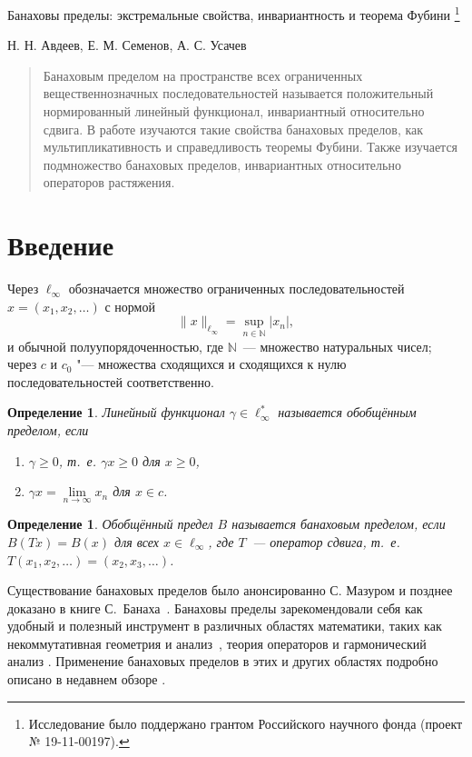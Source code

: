 \documentclass[12pt]{article}
\newtheorem{dfn}[thm]{Определение}
\begin{document}
\begin{center}
{
	\Large Банаховы пределы: экстремальные свойства, инвариантность и теорема Фубини
	\footnote{
		Исследование было поддержано грантом Российского научного фонда (проект № 19-11-00197).

	}
}

Н. Н. Авдеев, Е. М. Семенов, А. С. Усачев
\end{center}

\begin{abstract}
Банаховым пределом на пространстве всех ограниченных вещественнозначных последовательностей называется положительный нормированный линейный функционал, инвариантный относительно сдвига. В работе изучаются такие свойства банаховых пределов, как мультипликативность и справедливость теоремы Фубини. Также изучается подмножество банаховых пределов, инвариантных относительно операторов растяжения.
\end{abstract}


\section{Введение}


Через $\ell_\infty$ обозначается множество ограниченных
последовательностей $x=(x_1,x_2,\ldots)$ с нормой
\[
 \|x\|_{\ell_\infty}=\sup_{n\in \mathbb N}|x_n|,
\]
и обычной полуупорядоченностью, где ${\mathbb N}$~--- множество натуральных чисел;
через $c$ и $c_0$ "--- множества сходящихся и сходящихся к нулю последовательностей соответственно.

\begin{dfn}
Линейный функционал $\gamma\in \ell_\infty^*$ называется обобщённым пределом,
если
\begin{enumerate}
    \item $\gamma\geqslant0$, т.~е. $\gamma x \geqslant 0$ для $x \geqslant 0$,
    \item $\gamma x=\lim\limits_{n\to\infty} x_n$ для $x\in c$.
\end{enumerate}
\end{dfn}

\begin{dfn}
	Обобщённый предел $B$ называется банаховым пределом,
	если $B(Tx)=B(x)$ для всех $x\in \ell_\infty$, где $T$~---
    оператор сдвига, т.~е. $T(x_1,x_2,\ldots)=(x_2,x_3,\ldots)$.
\end{dfn}

Существование банаховых пределов было анонсированно С. Мазуром \cite{Mazur} и позднее доказано в книге С.~Банаха~\cite{banach2001theory_rus}.
Банаховы пределы зарекомендовали себя как удобный и полезный инструмент в различных областях математики, таких как некоммутативная геометрия и анализ~\cite{carey2006sledy}, теория операторов \cite{Sem_Sht} и гармонический анализ \cite{Ast_Sem, SU, U2}. Применение банаховых пределов в этих и других областях подробно описано в недавнем обзоре \cite{SSU_survey}.
\end{document}
